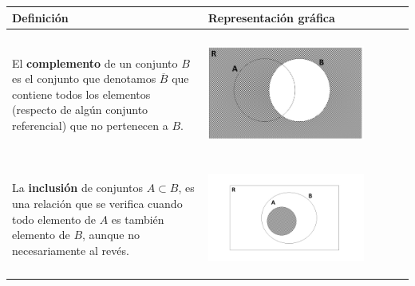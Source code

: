 \documentclass[12pt]{article}
\theoremstyle{definition}
\begin{document}
\begin{enumerate}
\begin{table}[ H]
\begin{center} 
\begin{tabular} { l l }
\textbf{Definición}& \textbf{Representación gráfica}\\ \hline  \\ 
\begin{minipage}{10cm} El \textbf{complemento} de un conjunto $B$ es el conjunto que denotamos $ \overline B$ que contiene todos los elementos (respecto de algún conjunto referencial) que no pertenecen a $B$. \end{minipage} & \begin{minipage}{5cm} \begin{center} 
\includegraphics[width= 0.8\textwidth]{tp1_fig4.jpg} 
\end{center}
\end{minipage}\\ \\
\begin{minipage}{10cm} La \textbf{inclusión} de conjuntos $A \subset B$, es una relación que se verifica cuando todo elemento de $A$ es también elemento de $B$, aunque no necesariamente al revés. \end{minipage} & \begin{minipage}{5cm}  \begin{center} 
\includegraphics[width=0.8\textwidth]{tp1_fig1.jpg} 

\end{center}
\end{minipage}
\end{tabular}
\end{center}
\end{table}
\end{enumerate}
\end{document}
